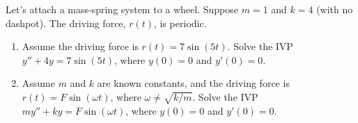 \begin{problem}%
Let's attach a mass-spring system to a wheel. Suppose $m=1$ and $k=4$ (with no dashpot). 
The driving force, $r(t)$, is periodic. 
\begin{enumerate}
 \item Assume the driving force is $r(t) = 7\sin(5t)$. Solve the IVP $y''+4y=7\sin(5t)$, where $y(0)=0$ and $y'(0)=0$. 
 \item
Assume $m$ and $k$ are known constants, and the driving force is $r(t) = F\sin(\omega t)$, where $\omega\neq \sqrt{k/m}$. Solve the IVP $my''+ky=F\sin(\omega t)$, where $y(0)=0$ and $y'(0)=0$.
\end{enumerate}
\end{problem}



